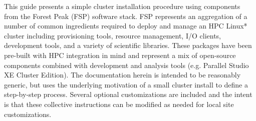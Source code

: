 This guide presents a simple cluster installation procedure using components
from the Forest Peak (FSP) software stack. FSP represents an aggregation of a number of
common ingredients required to deploy and manage an HPC Linux* cluster including
provisioning tools, resource management, I/O clients, development tools, and a variety of
scientific libraries. These packages have been pre-built with HPC integration
in mind and represent a mix of open-source components combined with \Intel{}
development and analysis tools (e.g. \Intel{} Parallel Studio XE Cluster Edition).
The documentation herein is intended to be reasonably generic, but uses the
underlying motivation of a small cluster install to define a step-by-step
process. Several optional customizations are included and the intent is that
these collective instructions can be modified as needed for local site
customizations. 
